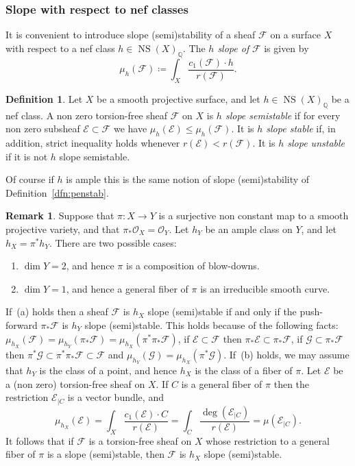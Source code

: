 \documentclass[11pt]{amsart}
\newcommand{\QQ}{{\mathbb Q}}
\let\mathcal\mathscr
\def\cE{\mathcal{E}}
\def\cF{\mathcal{F}}
\def\cG{\mathcal{G}}
\def\cO{\mathcal{O}}
\DeclareMathOperator{\NS}{NS}
\theoremstyle{definition}
\newtheorem{dfn}[lmm]{Definition}
\newtheorem{rmk}[lmm]{Remark}
\theoremstyle{remark}
\begin{document}
\subsubsection{Slope with respect to nef classes}
%
 It is convenient to introduce  slope (semi)stability of a sheaf $\cF$ on a surface $X$ with respect to a nef class  $h\in\NS(X)_{\QQ}$.  The \emph{$h$ slope of} 
$\cF$ is given by
\begin{equation}
%
\mu_{h}(\cF)\coloneqq
\int_X\frac{c_1(\cF) \cdot h}{r(\cF)}.
%
\end{equation}
%
%
\begin{dfn}
%
Let $X$ be a smooth projective surface, and let $h\in\NS(X)_{\QQ}$ be a nef class.  A non zero  torsion-free sheaf $\cF$ on $X$ is \emph{$h$ slope semistable} if for every non zero subsheaf 
$\cE\subset \cF$ 
we have $\mu_h(\cE)\le \mu_h(\cF)$.
It is \emph{$h$ slope stable} if, in addition, strict inequality holds whenever $r(\cE)<r(\cF)$. It is \emph{$h$ slope unstable} if it is not 
$h$ slope semistable.
%
\end{dfn}
%
Of course if $h$ is ample this is the same notion of slope (semi)stability of Definition~\ref{dfn:penstab}. 
%
\begin{rmk}\label{rmk:stabnonampio}
%
Suppose that $\pi\colon X\to Y$ is a surjective non constant map to a smooth projective variety, and  that $\pi_{*}\cO_X=\cO_Y$. Let  $h_Y$ be an ample class on $Y$, and let 
$h_X=\pi^{*}h_Y$. There are two  possible cases:
%
\begin{enumerate}
%
\item[(a)]
%
$\dim Y=2$, and hence $\pi$ is a composition of blow-downs.
%
\item[(b)]
%
$\dim Y=1$, and hence a general fiber of $\pi$ is an irreducible smooth curve. 
%
\end{enumerate}
%
If~(a) holds then a sheaf $\cF$ is $h_X$ slope (semi)stable if and only if the push-forward $\pi_{*}\cF$ is $h_Y$ slope (semi)stable. This holds because of the following facts: $\mu_{h_X}(\cF)=\mu_{h_Y}(\pi_{*}\cF)=\mu_{h_X}(\pi^{*}\pi_{*}\cF)$, 
if  $\cE\subset\cF$ then $\pi_{*}\cE\subset\pi_{*}\cF$,  if  $\cG\subset\pi_{*}\cF$ then 
$\pi^{*}\cG\subset\pi^{*}\pi_{*}\cF\subset\cF$ and $\mu_{h_Y}(\cG)=\mu_{h_X}(\pi^{*}\cG)$.
If~(b) holds, we may assume that $h_Y$ is the class of a point, and hence $h_X$ is the class of a fiber of $\pi$.
 Let  $\cE$ be a (non zero) torsion-free sheaf on $X$. If $C$ is a general fiber of $\pi$ then the restriction $\cE_{|C}$ is a vector bundle, and
\begin{equation}
%
\mu_{h_X}(\cE)=\int_X\frac{c_1(\cE)\cdot C}{r(\cE)}=\int_C\frac{\deg(\cE_{|C})}{r(\cE)}=\mu(\cE_{|C}).
%
\end{equation}
%
 It follows that if  $\cF$ is a torsion-free sheaf on $X$ whose restriction to a general fiber of $\pi$ is a slope (semi)stable,  then $\cF$ is $h_X$ slope (semi)stable. 
%
\end{rmk}
%
%
\end{document}
